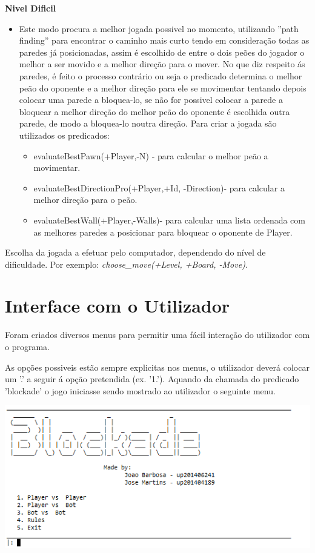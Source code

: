 \documentclass[a4paper]{article}
\begin{document}
\textbf{Nivel Dificil}
\begin{itemize}
\item Este modo procura a melhor jogada possivel no momento, utilizando ''path finding'' para encontrar o caminho mais curto tendo em consideração todas as paredes já posicionadas, assim é escolhido de entre o dois peões do jogador o melhor a ser movido e a melhor direção para o mover.
No que diz respeito ás paredes, é feito o processo contrário ou seja o predicado determina o melhor peão do oponente e a melhor direção para ele se movimentar tentando depois colocar uma parede a bloquea-lo, se não for possivel colocar a parede a bloquear a melhor direção do melhor peão do oponente é escolhida outra parede, de modo a bloquea-lo noutra direção.
 Para criar a jogada são utilizados os predicados:
 \begin{itemize}
		\item evaluateBestPawn(+Player,-N) - para calcular o melhor peão a movimentar.
		\item evaluateBestDirectionPro(+Player,+Id, -Direction)-  para calcular a melhor direção para o peão.
		\item evaluateBestWall(+Player,-Walls)- para calcular uma lista ordenada com as melhores paredes a posicionar para bloquear o oponente de Player.
	\end{itemize}
\end{itemize}







Escolha da jogada a efetuar pelo computador, dependendo do nível de dificuldade. Por exemplo: \textit{choose\_move(+Level, +Board, -Move)}.


\newpage
\section{Interface com o Utilizador}


Foram criados diversos menus para permitir uma fácil interação do utilizador com o programa.
\par As opções possiveis estão sempre explicitas nos menus, o utilizador deverá colocar um '.' a seguir á opção pretendida  (ex. '1.').
Aquando da chamada do predicado 'blockade' o jogo iniciasse sendo mostrado ao utilizador o seguinte menu.

\begin{center}
\includegraphics[scale = 0.7]{fig5.png}
\end{center}
\end{document}
